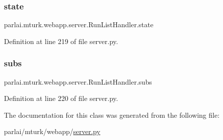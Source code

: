 \subsubsection{\texorpdfstring{state}{state}}
{\footnotesize\ttfamily parlai.\+mturk.\+webapp.\+server.\+Run\+List\+Handler.\+state}



Definition at line 219 of file server.\+py.

\mbox{\label{classparlai_1_1mturk_1_1webapp_1_1server_1_1RunListHandler_ae6ca04b925262123737c06bb6ce2bc4a}} 
\subsubsection{\texorpdfstring{subs}{subs}}
{\footnotesize\ttfamily parlai.\+mturk.\+webapp.\+server.\+Run\+List\+Handler.\+subs}



Definition at line 220 of file server.\+py.



The documentation for this class was generated from the following file\+:\begin{DoxyCompactItemize}
\item 
parlai/mturk/webapp/\hyperlink{server_8py}{server.\+py}\end{DoxyCompactItemize}
